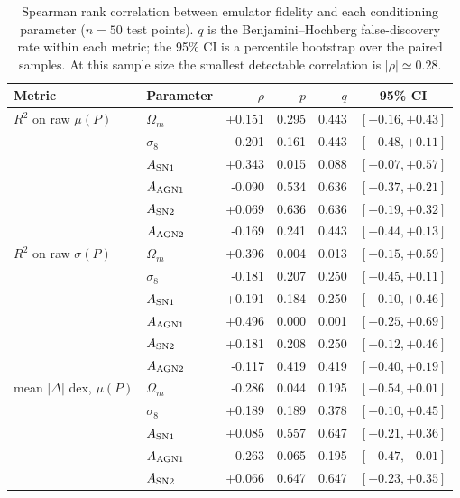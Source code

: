 \begin{table}[htbp]
    \centering
    \caption{Spearman rank correlation between emulator fidelity and each conditioning parameter ($n=50$ test points). $q$ is the Benjamini--Hochberg false-discovery rate within each metric; the 95\% CI is a percentile bootstrap over the paired samples. At this sample size the smallest detectable correlation is $|\rho|\simeq0.28$.}
    \label{tab:spearman_fidelity}
    \begin{tabular}{llrrrc}
        \toprule
        Metric & Parameter & $\rho$ & $p$ & $q$ & 95\% CI \\
        \midrule
        $R^2$ on raw $\mu(P)$ & $\Omega_m$ & +0.151 & 0.295 & 0.443 & $[-0.16, +0.43]$ \\
         & $\sigma_8$ & -0.201 & 0.161 & 0.443 & $[-0.48, +0.11]$ \\
         & $A_{\rm SN1}$ & +0.343 & 0.015 & 0.088 & $[+0.07, +0.57]$ \\
         & $A_{\rm AGN1}$ & -0.090 & 0.534 & 0.636 & $[-0.37, +0.21]$ \\
         & $A_{\rm SN2}$ & +0.069 & 0.636 & 0.636 & $[-0.19, +0.32]$ \\
         & $A_{\rm AGN2}$ & -0.169 & 0.241 & 0.443 & $[-0.44, +0.13]$ \\
        \midrule
        $R^2$ on raw $\sigma(P)$ & $\Omega_m$ & +0.396 & 0.004 & 0.013 & $[+0.15, +0.59]$ \\
         & $\sigma_8$ & -0.181 & 0.207 & 0.250 & $[-0.45, +0.11]$ \\
         & $A_{\rm SN1}$ & +0.191 & 0.184 & 0.250 & $[-0.10, +0.46]$ \\
         & $A_{\rm AGN1}$ & +0.496 & 0.000 & 0.001 & $[+0.25, +0.69]$ \\
         & $A_{\rm SN2}$ & +0.181 & 0.208 & 0.250 & $[-0.12, +0.46]$ \\
         & $A_{\rm AGN2}$ & -0.117 & 0.419 & 0.419 & $[-0.40, +0.19]$ \\
        \midrule
        mean $|\Delta|$ dex, $\mu(P)$ & $\Omega_m$ & -0.286 & 0.044 & 0.195 & $[-0.54, +0.01]$ \\
         & $\sigma_8$ & +0.189 & 0.189 & 0.378 & $[-0.10, +0.45]$ \\
         & $A_{\rm SN1}$ & +0.085 & 0.557 & 0.647 & $[-0.21, +0.36]$ \\
         & $A_{\rm AGN1}$ & -0.263 & 0.065 & 0.195 & $[-0.47, -0.01]$ \\
         & $A_{\rm SN2}$ & +0.066 & 0.647 & 0.647 & $[-0.23, +0.35]$ \\

\end{tabular}
\end{table}
